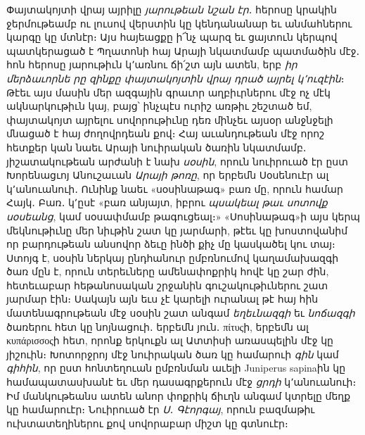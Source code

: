 \documentclass{article}
\begin{document}
{Փայտակոյտի վրայ այրիլը \emph{յարութեան նշան էր․} հերոսը կրակին ջերմութեամբ ու լուսով վերստին կը կենդանանար եւ անմահներու կարգը կը մտնէր։ Այս հայեացքը ի՜նչ պարզ եւ ցայտուն կերպով պատկերացած է Պղատոնի հայ Արայի նկատմամբ պատմածին մէջ․ հոն հերոսը յարութիւն կ՚առնու ճի՛շտ այն ատեն, երբ \emph{իր մերձաւորնե րը զինքը փայտակոյտին վրայ դրած այրել կ՚ուզէին}։ Թէեւ այս մասին մեր ազգային գրաւոր աղբիւրներու մէջ ոչ մէկ ակնարկութիւն կայ, բայց՝ ինչպէս ուրիշ առթիւ շեշտած եմ, փայտակոյտ այրելու սովորութիւնը դեռ մինչեւ այսօր անջնջելի մնացած է հայ ժողովրդեան քով։ Հայ աւանդութեան մէջ որոշ հետքեր կան նաեւ Արայի նուիրական ծառին նկատմամբ․ յիշատակութեան արժանի է նախ \emph{սօսին}, որուն նուիրուած էր ըստ Խորենացւոյ Անուշաւան \emph{Արայի թոռը}, որ երբեմն Սօսենուէր ալ կ՚անուանուի․ Ունինք նաեւ «սօսինաթագ» բառ մը, որուն համար Հայկ․ Բառ․ կ՚ըսէ «բառ անյայտ, իբրու \emph{պսակեալ թաւ սոտովք սօսեանց}, կամ սօսափմամբ թագուցեալ։» «Սոսինաթագ»ի այս կերպ մեկնութիւնը մեր նիւթին շատ կը յարմարի, թէեւ կը խոստովանիմ որ բարդութեան անսովոր ձեւը ինծի քիչ մը կասկածել կու տայ։ Ստոյգ է, սօսին ներկայ ընդհանուր ըմբռնումով կաղամախազգի ծառ մըն է, որուն տերեւները ամենափոքրիկ հովէ կը շար ժին, հետեւաբար հեթանոսական շրջանին գուշակութիւներու շատ յարմար էին։ Սակայն այն եւս չէ կարելի ուրանալ թէ հայ հին մատենագրութեան մէջ սօսին շատ անգամ \emph{եղեւնազգի} եւ \emph{նոճազգի} ծառերու հետ կը նոյնացուի․ երբեմն յուն․ πίτυςի, երբեմն ալ κυπάρισσοςի հետ, որոնք երկուքն ալ Ատտիսի առասպելին մէջ կը յիշուին։ Խոտորջրոյ մէջ նուիրական ծառ կը համարուի \emph{գին} կամ \emph{գիհին}, որ ըստ հոնտեղուան ըմբռնման աւելի Juniperus sapinaին կը համապատասխանէ եւ մեր դասագրքերուն մէջ \emph{ցրդի} կ՚անուանուի։ Իմ մանկութեանս ատեն անոր փոքրիկ ճիւղն անգամ կտրելը մեղք կը համարուէր։ Նուիրուած էր \emph{Ս․ Գէորգայ}, որուն բազմաթիւ ուխտատեղիներու քով սովորաբար միշտ կը գտնուէր։

}
\end{document}
